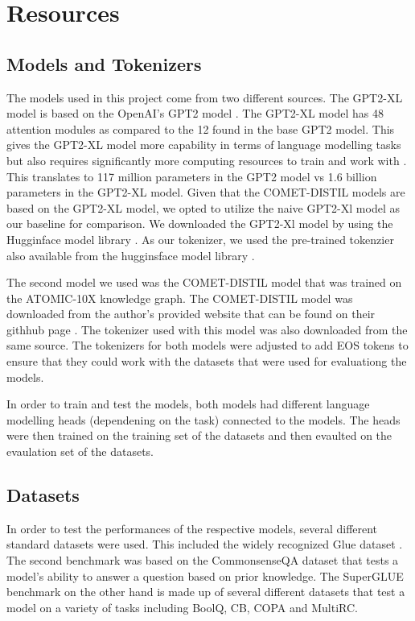 \documentclass[\main/thesis.tex]{subfiles}
\begin{document}
\chapter{Resources}\label{sec:resources} 


\section{Models and Tokenizers}\label{sec:models}

The models used in this project come from two different sources. The GPT2-XL model is based on the OpenAI's GPT2 model 
\cite{radford_language_nodate}. The GPT2-XL model has 48 attention modules as compared to the 12 found in the base 
GPT2 model. This gives the GPT2-XL model more capability in terms of language modelling tasks but also requires 
significantly more computing resources to train and work with \cite{noauthor_pretrained_nodate}. This translates to 117 
million parameters in the GPT2 model vs 1.6 billion parameters in the GPT2-XL model. Given that the COMET-DISTIL models
are based on the GPT2-XL model, we opted to utilize the naive GPT2-Xl model as our baseline for comparison. We 
downloaded the GPT2-Xl model by using the Hugginface model library \cite{noauthor_gpt2-xl_nodate}. As our tokenizer, we 
used the pre-trained tokenzier also available from the hugginsface model library \cite{noauthor_gpt2-xl_nodate}. 

The second model we used was the COMET-DISTIL model \cite{west_symbolic_2021} that was trained on the ATOMIC-10X 
knowledge graph. The COMET-DISTIL model was downloaded from the author's provided website that can be found on their 
githhub page \cite{peterwestai2_symbolic_2022}. The tokenizer used with this model was also downloaded from the same 
source. The tokenizers for both models were adjusted to add EOS tokens to ensure that they could work with the datasets 
that were used for evaluationg the models. 

In order to train and test the models, both models had different language modelling heads (dependening on the task) 
connected to the models. The heads were then trained on the training set of the datasets and then evaulted on 
the evaulation set of the datasets. 

\section{Datasets}\label{sec:datasets}
In order to test the performances of the respective models, several different standard datasets were used. This 
included the widely recognized Glue dataset \cite{}. The second benchmark was based on the 
CommonsenseQA dataset \cite{talmor_commonsenseqa_2018} that tests a model's ability to answer a question based on prior 
knowledge. The SuperGLUE benchmark on the other hand is made up of several different datasets that test a model on a 
variety of tasks including BoolQ, CB, COPA and MultiRC. 
\end{document}
